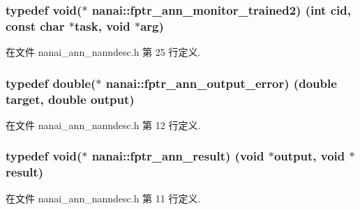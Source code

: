 \hypertarget{namespacenanai_a598e872bf861dac8080e98d6d155b3b5}{}
\subsubsection[{fptr\+\_\+ann\+\_\+monitor\+\_\+trained2}]{\setlength{\rightskip}{0pt plus 5cm}typedef void($\ast$ nanai\+::fptr\+\_\+ann\+\_\+monitor\+\_\+trained2) (int cid, const char $\ast$task, void $\ast$arg)}\label{namespacenanai_a598e872bf861dac8080e98d6d155b3b5}


在文件 nanai\+\_\+ann\+\_\+nanndesc.\+h 第 25 行定义.

\hypertarget{namespacenanai_a5e697a4846a90e7e161e1d2d5be57688}{}
\subsubsection[{fptr\+\_\+ann\+\_\+output\+\_\+error}]{\setlength{\rightskip}{0pt plus 5cm}typedef double($\ast$ nanai\+::fptr\+\_\+ann\+\_\+output\+\_\+error) (double target, double output)}\label{namespacenanai_a5e697a4846a90e7e161e1d2d5be57688}


在文件 nanai\+\_\+ann\+\_\+nanndesc.\+h 第 12 行定义.

\hypertarget{namespacenanai_ab737ac3c4f32f96a8ee6400db1c5a90f}{}
\subsubsection[{fptr\+\_\+ann\+\_\+result}]{\setlength{\rightskip}{0pt plus 5cm}typedef void($\ast$ nanai\+::fptr\+\_\+ann\+\_\+result) (void $\ast$output, void $\ast$result)}\label{namespacenanai_ab737ac3c4f32f96a8ee6400db1c5a90f}


在文件 nanai\+\_\+ann\+\_\+nanndesc.\+h 第 11 行定义.

\hypertarget{namespacenanai_a892a8c80381d0005a076b68fbbf2d918}{}
